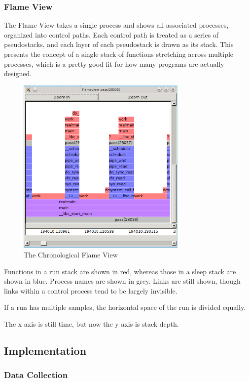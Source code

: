\documentclass[10pt]{article}
\begin{document}
\subsubsection{Flame View}

The Flame View takes a single process and shows all associated processes, organized into control paths.  Each control path is treated as a series of pseudostacks, and each layer of each pseudostack is drawn as its stack.  This presents the concept of a single stack of functions stretching across multiple processes, which is a pretty good fit for how many programs are actually designed.

\begin{figure}[h]
\includegraphics[width=3.25in]{flameshot}
\caption{The Chronological Flame View}
\end{figure}

Functions in a run stack are shown in red, whereas those in a sleep stack are shown in blue.  Process names are shown in grey.  Links are still shown, though links within a control process tend to be largely invisible.

If a run has multiple samples, the horizontal space of the run is divided equally.

The x axis is still time, but now the y axis is stack depth.

\subsection{Implementation}
\subsubsection{Data Collection}
\end{document}

